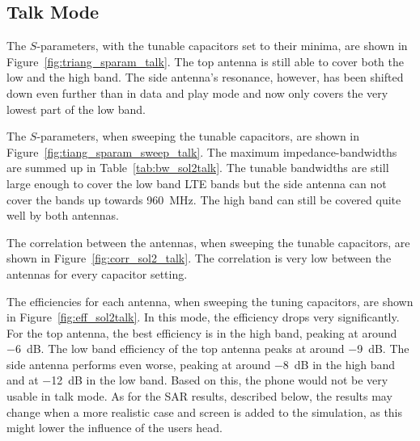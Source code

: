 \FloatBarrier
\subsection{Talk Mode}
The $S$-parameters, with the tunable capacitors set to their minima, are shown in Figure~\ref{fig:triang_sparam_talk}. The top antenna is still able to cover both the low and the high band. The side antenna's resonance, however, has been shifted down even further than in data and play mode and now only covers the very lowest part of the low band.

The $S$-parameters, when sweeping the tunable capacitors, are shown in Figure~\ref{fig:tiang_sparam_sweep_talk}. The maximum impedance-bandwidths are summed up in Table~\ref{tab:bw_sol2talk}. The tunable bandwidths are still large enough to cover the low band LTE bands but the side antenna can not cover the bands up towards \SI{960}{MHz}. The high band can still be covered quite well by both antennas.

The correlation between the antennas, when sweeping the tunable capacitors, are shown in Figure~\ref{fig:corr_sol2_talk}. The correlation is very low between the antennas for every capacitor setting.

The efficiencies for each antenna, when sweeping the tuning capacitors, are shown in Figure~\ref{fig:eff_sol2talk}. In this mode, the efficiency drops very significantly. For the top antenna, the best efficiency is in the high band, peaking at around \SI{-6}{dB}. The low band efficiency of the top antenna peaks at around \SI{-9}{dB}. The side antenna performs even worse, peaking at around \SI{-8}{dB} in the high band and at \SI{-12}{dB} in the low band. Based on this, the phone would not be very usable in talk mode. As for the SAR results, described below, the results may change when a more realistic case and screen is added to the simulation, as this might lower the influence of the users head.

